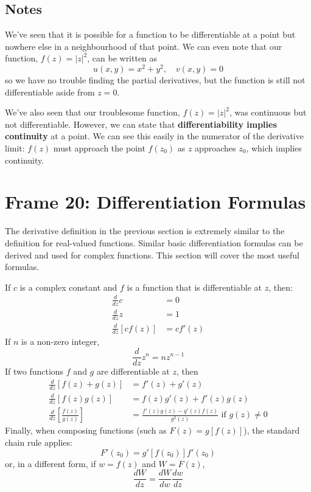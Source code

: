 \documentclass{article}
\renewcommand{\emph}{\textbf}
\begin{document}
\subsection{Notes}
We've seen that it is possible for a function to be differentiable at a point but nowhere else in a neighbourhood of that point. We can even note that our function, $f(z) = |z|^2$, can be written as
\[
	u(x, y) = x^2 + y^2,	\quad	v(x, y) = 0
\]
so we have no trouble finding the partial derivatives, but the function is still not differentiable aside from $z = 0$.

We've also seen that our troublesome function, $f(z) = |z|^2$, was continuous but not differentiable. However, we can state that \emph{differentiability implies continuity} at a point. We can see this easily in the numerator of the derivative limit: $f(z)$ must approach the point $f(z_0)$ as $z$ approaches $z_0$, which implies continuity.


\clearpage
\section{Frame 20: Differentiation Formulas}
The derivative definition in the previous section is extremely similar to the definition for real-valued functions. Similar basic differentiation formulas can be derived and used for complex functions. This section will cover the most useful formulas.

If $c$ is a complex constant and $f$ is a function that is differentiable at $z$, then:
\begin{align*}
	\frac{d}{dz} c &= 0 \\
	\frac{d}{dz} z &= 1 \\
	\frac{d}{dz} [cf(z)] &= cf'(z)
\end{align*}
If $n$ is a non-zero integer,
\[
	\frac{d}{dz} z^n = nz^{n-1}
\]
If two functions $f$ and $g$ are differentiable at $z$, then
\begin{align*}
	\frac{d}{dz} [f(z) + g(z)] &= f'(z) + g'(z) \\
	\frac{d}{dz} [f(z)g(z)] &= f(z)g'(z) + f'(z)g(z) \\
	\frac{d}{dz} \left[\frac{f(z)}{g(z)}\right] &= \frac{f'(z)g(z) - g'(z)f(z)}{g^2(z)} \text{ if $g(z) \neq 0$}
\end{align*}
Finally, when composing functions (such as $F(z) = g[f(z)]$), the standard chain rule applies:
\[
	F'(z_0) = g'[f(z_0)] f'(z_0)
\]
or, in a different form, if $w = f(z)$ and $W = F(z)$,
\[
	\frac{dW}{dz} = \frac{dW}{dw} \frac{dw}{dz}
\]
\end{document}
